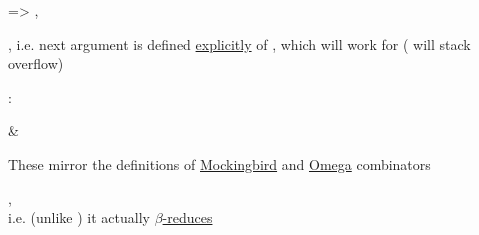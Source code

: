  => ,
\begin{enumerate}
    \vItem {},
    i.e. next argument is defined \ul{explicitly}
    \vItem {} of , which will work for
     ( will stack overflow)
\end{enumerate}

:
\begin{enumerate}
    \vItem {} \&

    \vItem These mirror the definitions of \ul{Mockingbird} and \ul{Omega} combinators

    \vItem {}, \\
    i.e. (unlike ) it actually \ul{$\beta$-reduces} 
\end{enumerate}

\hSep
\vspace{2pt}